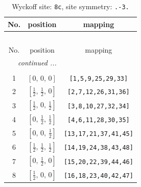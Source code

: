 \documentclass[fleqn,8pt]{jsarticle}
\begin{document}
\begin{longtable}{ccc}
\caption{Wyckoff site: {\tt 8c}, site symmetry: {\tt .-3.}}
 \\
 \hline \hline
No. & position & mapping \\ \hline \endfirsthead

\multicolumn{2}{l}{\tablename\ \thetable{}} \\
 \hline \hline
No. & position & mapping \\ \hline \endhead

 \hline \hline
\multicolumn{2}{r}{\footnotesize\it continued ...} \\ \endfoot

 \hline \hline
\multicolumn{2}{r}{} \\ \endlastfoot

1 & $\left[ 0,\, 0,\, 0 \right]$ & {\tt [1,5,9,25,29,33]} \\ \hline
2 & $\left[ \frac{1}{2},\, \frac{1}{2},\, 0 \right]$ & {\tt [2,7,12,26,31,36]} \\ \hline
3 & $\left[ \frac{1}{2},\, 0,\, \frac{1}{2} \right]$ & {\tt [3,8,10,27,32,34]} \\ \hline
4 & $\left[ 0,\, \frac{1}{2},\, \frac{1}{2} \right]$ & {\tt [4,6,11,28,30,35]} \\ \hline
5 & $\left[ 0,\, 0,\, \frac{1}{2} \right]$ & {\tt [13,17,21,37,41,45]} \\ \hline
6 & $\left[ \frac{1}{2},\, \frac{1}{2},\, \frac{1}{2} \right]$ & {\tt [14,19,24,38,43,48]} \\ \hline
7 & $\left[ 0,\, \frac{1}{2},\, 0 \right]$ & {\tt [15,20,22,39,44,46]} \\ \hline
8 & $\left[ \frac{1}{2},\, 0,\, 0 \right]$ & {\tt [16,18,23,40,42,47]} \\
\end{longtable}
\renewcommand{\arraystretch}{1.2}
\end{document}
